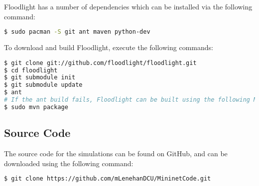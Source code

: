 Floodlight has a number of dependencies which can be installed via the following
command:

\begin{lstlisting}[language=bash, caption=Floodlight Dependencies]
$ sudo pacman -S git ant maven python-dev
\end{lstlisting}

To download and build Floodlight, execute the following commands:

\begin{lstlisting}[language=bash, caption=Floodlight installation commands]
$ git clone git://github.com/floodlight/floodlight.git
$ cd floodlight
$ git submodule init
$ git submodule update
$ ant
# If the ant build fails, Floodlight can be built using the following Maven command
$ sudo mvn package
\end{lstlisting}

\subsection{Source Code}

The source code for the simulations can be found on GitHub, and can be
downloaded using the following command:

\begin{lstlisting}[language=bash, caption=Source code download]
$ git clone https://github.com/mLenehanDCU/MininetCode.git
\end{lstlisting}
